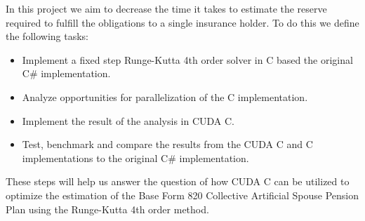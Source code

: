 
In this project we aim to decrease the time it takes to estimate the reserve required to fulfill the obligations to a single insurance holder. To do this we define the following tasks:

\begin{itemize}
	\item Implement a fixed step Runge-Kutta 4th order solver in C based the original C\# implementation.
	\item Analyze opportunities for parallelization of the C implementation.
	\item Implement the result of the analysis in CUDA C.
	\item Test, benchmark and compare the results from the CUDA C and C implementations to the original C\# implementation.
\end{itemize}

These steps will help us answer the question of how CUDA C can be utilized to optimize the estimation of the Base Form 820 Collective Artificial Spouse Pension Plan using the Runge-Kutta 4th order method.